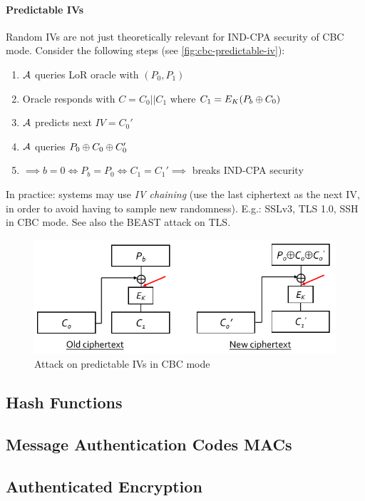 \paragraph{Predictable IVs}
Random IVs are not just theoretically relevant for IND-CPA security of CBC mode.
Consider the following steps (see \autoref{fig:cbc-predictable-iv}):
\begin{enumerate}
\item $\mathcal{A}$ queries LoR oracle with $(P_0, P_1)$
\item Oracle responds with $C = C_0||C_1$ where $C_1 = E_K(P_b \oplus C_0)$
\item $\mathcal{A}$ predicts next $IV=C_0'$
\item $\mathcal{A}$ queries $P_0 \oplus C_0 \oplus C_0'$
\item $\implies b = 0 \iff P_b = P_0 \iff C_1 = C_1' \implies$ breaks IND-CPA security
\end{enumerate}

In practice: systems may use \emph{IV chaining} (use the last ciphertext as the next IV, in order to avoid having to sample new randomness).
E.g.: SSLv3, TLS 1.0, SSH in CBC mode.
See also the BEAST attack on TLS.

\begin{figure}[h]
    \centering
	\includegraphics[scale=0.6]{images/cbc-predictable-iv.png}
    \caption{Attack on predictable IVs in CBC mode}
    \label{fig:cbc-predictable-iv}
\end{figure}



\subsection{Hash Functions}


\subsection{Message Authentication Codes MACs}


\subsection{Authenticated Encryption}

